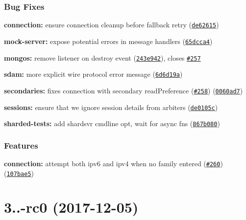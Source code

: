 \subsubsection*{Bug Fixes}


\begin{DoxyItemize}
\item {\bfseries connection\+:} ensure connection cleanup before fallback retry (\href{https://github.com/christkv/mongodb-core/commit/de62615}{\tt de62615})
\item {\bfseries mock-\/server\+:} expose potential errors in message handlers (\href{https://github.com/christkv/mongodb-core/commit/65dcca4}{\tt 65dcca4})
\item {\bfseries mongos\+:} remove listener on destroy event (\href{https://github.com/christkv/mongodb-core/commit/243e942}{\tt 243e942}), closes \href{https://github.com/christkv/mongodb-core/issues/257}{\tt \#257}
\item {\bfseries sdam\+:} more explicit wire protocol error message (\href{https://github.com/christkv/mongodb-core/commit/6d6d19a}{\tt 6d6d19a})
\item {\bfseries secondaries\+:} fixes connection with secondary read\+Preference (\href{https://github.com/christkv/mongodb-core/issues/258}{\tt \#258}) (\href{https://github.com/christkv/mongodb-core/commit/0060ad7}{\tt 0060ad7})
\item {\bfseries sessions\+:} ensure that we ignore session details from arbiters (\href{https://github.com/christkv/mongodb-core/commit/de0105c}{\tt de0105c})
\item {\bfseries sharded-\/tests\+:} add {\ttfamily shardsvr} cmdline opt, wait for async fns (\href{https://github.com/christkv/mongodb-core/commit/867b080}{\tt 867b080})
\end{DoxyItemize}

\subsubsection*{Features}


\begin{DoxyItemize}
\item {\bfseries connection\+:} attempt both ipv6 and ipv4 when no family entered (\href{https://github.com/christkv/mongodb-core/issues/260}{\tt \#260}) (\href{https://github.com/christkv/mongodb-core/commit/107bae5}{\tt 107bae5})
\end{DoxyItemize}

\label{_3.0.0-rc0}%
 \section*{3..-\/rc0 (2017-\/12-\/05)}

